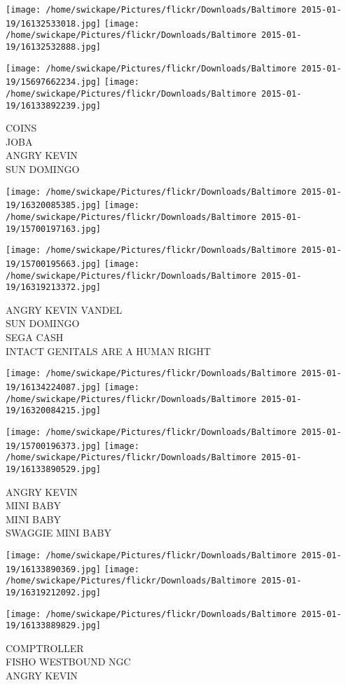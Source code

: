 \documentclass[10pt,letterpaper]{article}
\begin{document}
\texttt{[image: /home/swickape/Pictures/flickr/Downloads/Baltimore 2015-01-19/16132533018.jpg]}
\texttt{[image: /home/swickape/Pictures/flickr/Downloads/Baltimore 2015-01-19/16132532888.jpg]}

\texttt{[image: /home/swickape/Pictures/flickr/Downloads/Baltimore 2015-01-19/15697662234.jpg]}
\texttt{[image: /home/swickape/Pictures/flickr/Downloads/Baltimore 2015-01-19/16133892239.jpg]}

COINS\\
JOBA\\
ANGRY KEVIN\\
SUN DOMINGO\\
\pagebreak

\texttt{[image: /home/swickape/Pictures/flickr/Downloads/Baltimore 2015-01-19/16320085385.jpg]}
\texttt{[image: /home/swickape/Pictures/flickr/Downloads/Baltimore 2015-01-19/15700197163.jpg]}

\texttt{[image: /home/swickape/Pictures/flickr/Downloads/Baltimore 2015-01-19/15700195663.jpg]}
\texttt{[image: /home/swickape/Pictures/flickr/Downloads/Baltimore 2015-01-19/16319213372.jpg]}

ANGRY KEVIN VANDEL\\
SUN DOMINGO\\
SEGA CASH\\
INTACT GENITALS ARE A HUMAN RIGHT\\
\pagebreak

\texttt{[image: /home/swickape/Pictures/flickr/Downloads/Baltimore 2015-01-19/16134224087.jpg]}
\texttt{[image: /home/swickape/Pictures/flickr/Downloads/Baltimore 2015-01-19/16320084215.jpg]}

\texttt{[image: /home/swickape/Pictures/flickr/Downloads/Baltimore 2015-01-19/15700196373.jpg]}
\texttt{[image: /home/swickape/Pictures/flickr/Downloads/Baltimore 2015-01-19/16133890529.jpg]}

ANGRY KEVIN\\
MINI BABY\\
MINI BABY\\
SWAGGIE MINI BABY\\
\pagebreak

\texttt{[image: /home/swickape/Pictures/flickr/Downloads/Baltimore 2015-01-19/16133890369.jpg]}
\texttt{[image: /home/swickape/Pictures/flickr/Downloads/Baltimore 2015-01-19/16319212092.jpg]}

\texttt{[image: /home/swickape/Pictures/flickr/Downloads/Baltimore 2015-01-19/16133889829.jpg]}

COMPTROLLER\\
FISHO WESTBOUND NGC\\
ANGRY KEVIN\\
\pagebreak
\end{document}
